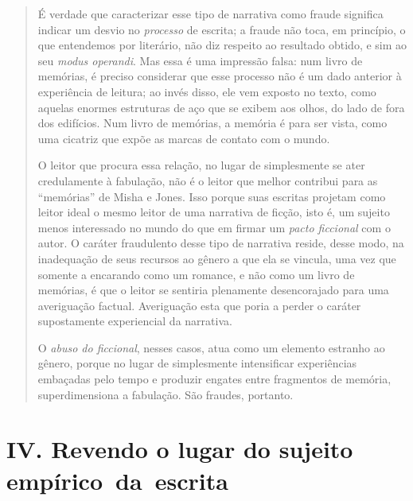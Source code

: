 \begin{quote}
É verdade que caracterizar esse tipo de narrativa como fraude significa
indicar um desvio no \emph{processo} de escrita; a fraude não toca, em
princípio, o que entendemos por literário, não diz respeito ao resultado
obtido, e sim ao seu \emph{modus operandi}. Mas essa é uma impressão
falsa: num livro de memórias, é preciso considerar que esse processo não
é um dado anterior à experiência de leitura; ao invés disso, ele vem
exposto no texto, como aquelas enormes estruturas de aço que se exibem
aos olhos, do lado de fora dos edifícios. Num livro de memórias, a
memória é para ser vista, como uma cicatriz que expõe as marcas de
contato com o mundo.

O leitor que procura essa relação, no lugar de simplesmente se ater
credulamente à fabulação, não é o leitor que melhor contribui para as
``memórias'' de Misha e Jones. Isso porque suas escritas projetam como
leitor ideal o mesmo leitor de uma narrativa de ficção, isto é, um
sujeito menos interessado no mundo do que em firmar um \emph{pacto
ficcional} com o autor. O caráter fraudulento desse tipo de narrativa
reside, desse modo, na inadequação de seus recursos ao gênero a que ela
se vincula, uma vez que somente a encarando como um romance, e não como
um livro de memórias, é que o leitor se sentiria plenamente
desencorajado para uma averiguação factual. Averiguação esta que poria a
perder o caráter supostamente experiencial da narrativa.

O \emph{abuso do ficcional}, nesses casos, atua como um elemento
estranho ao gênero, porque no lugar de simplesmente intensificar
experiências embaçadas pelo tempo e produzir engates entre fragmentos de
memória, superdimensiona a fabulação. São fraudes, portanto.
\end{quote}

\section*{IV. Revendo o lugar do sujeito empírico~da~escrita}

